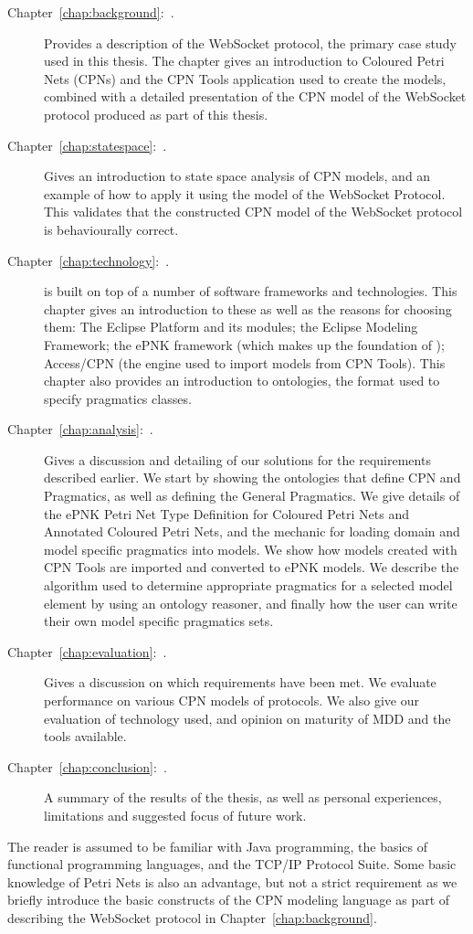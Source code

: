 \begin{description}
\item[Chapter~\ref{chap:background}:~.] Provides a
description of the WebSocket protocol, the primary case study used in this
thesis. The chapter gives an introduction to Coloured Petri Nets (CPNs) and the
CPN Tools application used to create the models, combined with a detailed
presentation of the CPN model of the WebSocket protocol produced as part of this
thesis.
\item[Chapter~\ref{chap:statespace}:~.] Gives an
introduction to state space analysis of CPN models, and an example of how to
apply it using the model of the WebSocket Protocol. This validates that the
constructed CPN model of the WebSocket protocol is behaviourally correct.
\item [Chapter~\ref{chap:technology}:~.] \thename{} is built
on top of a number of software frameworks and technologies.
This chapter gives an introduction to these as well as the reasons for choosing
them: The Eclipse Platform and its modules; the Eclipse Modeling Framework; the ePNK
framework (which makes up the foundation of \thename{}); Access/CPN (the engine
used to import models from CPN Tools). This chapter also provides an
introduction to ontologies, the format used to specify pragmatics classes.
\item [Chapter~\ref{chap:analysis}:~.] Gives a
discussion and detailing of our solutions for the requirements described
earlier. We start by showing the ontologies that define CPN and Pragmatics, as
well as defining the General Pragmatics. We give details of the ePNK Petri Net
Type Definition for Coloured Petri Nets and Annotated Coloured Petri Nets, and
the mechanic for loading domain and model specific pragmatics into
models. We show how models created with CPN Tools are imported and converted to
ePNK models.
We describe the algorithm used to determine appropriate pragmatics for a
selected model element by using an ontology reasoner, and finally how the user
can write their own model specific pragmatics sets.
\item [Chapter~\ref{chap:evaluation}:~.] Gives
a discussion on which requirements have been met. We evaluate performance on
various CPN models of protocols. We also give our evaluation of technology used,
and opinion on maturity of MDD and the tools available.
\item [Chapter~\ref{chap:conclusion}:~.] A summary of
the results of the thesis, as well as personal experiences, limitations and
suggested focus of future work.
\end{description} 


The reader is assumed to be familiar with Java programming, the basics of
functional programming languages, and the TCP/IP Protocol Suite. Some basic
knowledge of Petri Nets is also an advantage, but not a strict requirement as we
briefly introduce the basic constructs of the CPN modeling language as part of
describing the WebSocket protocol in Chapter~\ref{chap:background}.

